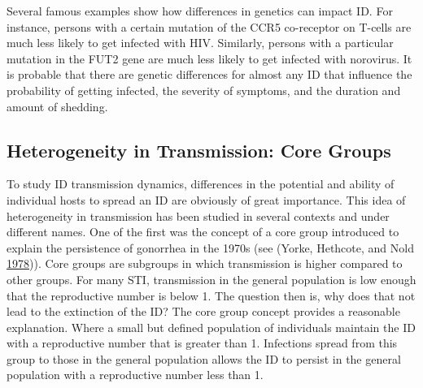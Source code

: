 \documentclass[]{article}
\theoremstyle{definition}
\theoremstyle{definition}
\theoremstyle{definition}
\theoremstyle{remark}
\begin{document}
Several famous examples show how differences in genetics can impact ID.
For instance, persons with a certain mutation of the CCR5 co-receptor on
T-cells are much less likely to get infected with HIV. Similarly,
persons with a particular mutation in the FUT2 gene are much less likely
to get infected with norovirus. It is probable that there are genetic
differences for almost any ID that influence the probability of getting
infected, the severity of symptoms, and the duration and amount of
shedding.

\subsection{Heterogeneity in Transmission: Core
Groups}\label{heterogeneity-in-transmission-core-groups}

To study ID transmission dynamics, differences in the potential and
ability of individual hosts to spread an ID are obviously of great
importance. This idea of heterogeneity in transmission has been studied
in several contexts and under different names. One of the first was the
concept of a core group introduced to explain the persistence of
gonorrhea in the 1970s (see (Yorke, Hethcote, and Nold
\protect\hyperlink{ref-yorke78}{1978})). Core groups are subgroups in
which transmission is higher compared to other groups. For many STI,
transmission in the general population is low enough that the
reproductive number is below 1. The question then is, why does that not
lead to the extinction of the ID? The core group concept provides a
reasonable explanation. Where a small but defined population of
individuals maintain the ID with a reproductive number that is greater
than 1. Infections spread from this group to those in the general
population allows the ID to persist in the general population with a
reproductive number less than 1.
\end{document}
